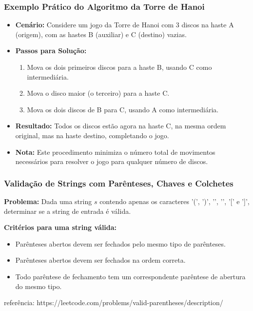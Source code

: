 \begin{frame}[fragile]
  \frametitle{Exemplo Prático do Algoritmo da Torre de Hanoi}
  \begin{itemize}
    \item \textbf{Cenário:} Considere um jogo da Torre de Hanoi com 3 discos na haste A (origem), com as hastes B (auxiliar) e C (destino) vazias.
    \item \textbf{Passos para Solução:}
      \begin{enumerate}
        \item Mova os dois primeiros discos para a haste B, usando C como intermediária.
        \item Mova o disco maior (o terceiro) para a haste C.
        \item Mova os dois discos de B para C, usando A como intermediária.
      \end{enumerate}
    \item \textbf{Resultado:} Todos os discos estão agora na haste C, na mesma ordem original, mas na haste destino, completando o jogo.
    \item \textbf{Nota:} Este procedimento minimiza o número total de movimentos necessários para resolver o jogo para qualquer número de discos.
  \end{itemize}
\end{frame}

\begin{frame}[fragile]
  \frametitle{Validação de Strings com Parênteses, Chaves e Colchetes}

  \textbf{Problema:} Dada uma string \(s\) contendo apenas os caracteres '(', ')', '{', '}', '[' e ']', determinar se a string de entrada é válida.

  \textbf{Critérios para uma string válida:}
  \begin{itemize}
    \item Parênteses abertos devem ser fechados pelo mesmo tipo de parênteses.
    \item Parênteses abertos devem ser fechados na ordem correta.
    \item Todo parêntese de fechamento tem um correspondente parêntese de abertura do mesmo tipo.
  \end{itemize}

  \tiny 
  referência: https://leetcode.com/problems/valid-parentheses/description/
\end{frame}

